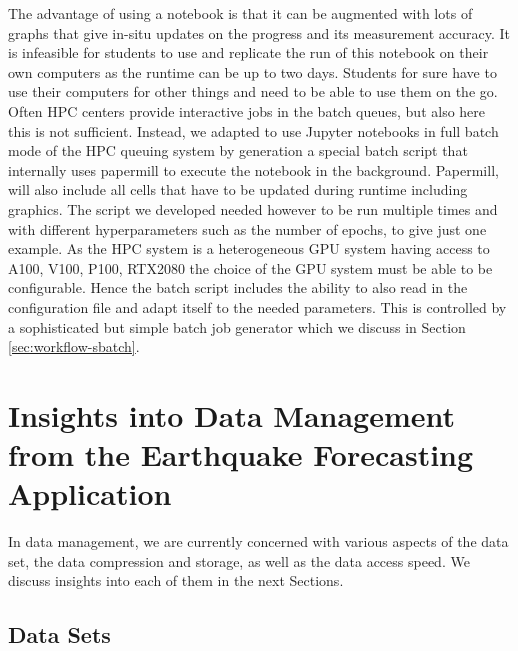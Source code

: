 \documentclass[utf8]{FrontiersinVancouver} %
\begin{document}
{The advantage of using a notebook is that it can be augmented with
lots of graphs that give in-situ updates on the progress and its
measurement accuracy. It is infeasible for students to use and
replicate the run of this notebook on their own computers as the
runtime can be up to two days. Students for sure have to use their
computers for other things and need to be able to use them on the
go. Often HPC centers provide interactive jobs in the batch queues,
but also here this is not sufficient. Instead, we adapted to use
Jupyter notebooks in full batch mode of the HPC queuing system by
generation a special batch script that internally uses papermill to
execute the notebook in the background. Papermill, will also include
all cells that have to be updated during runtime including
graphics. The script we developed needed however to be run multiple
times and with different hyperparameters such as the number of epochs,
to give just one example. As the HPC system is a heterogeneous GPU
system having access to A100, V100, P100, RTX2080 the choice of the
GPU system must be able to be configurable. Hence the batch script
includes the ability to also read in the configuration file and adapt
itself to the needed parameters. This is controlled by a sophisticated
but simple batch job generator which we discuss in Section
\ref{sec:workflow-sbatch}.



\section{Insights into Data Management from the Earthquake Forecasting Application}
\label{sec:eq-data}

In data management, we are currently concerned with various aspects of
the data set, the data compression and storage, as well as the data
access speed. We discuss insights into each of them in the next
Sections.

\subsection{Data Sets}


}
\end{document}
